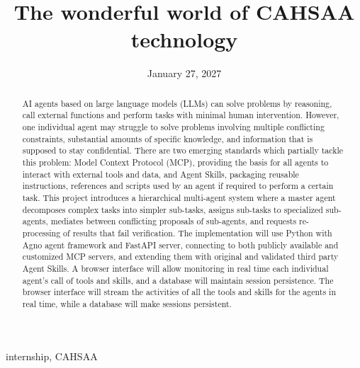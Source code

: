 \documentclass[12pt,conference,onecolumn]{IEEEtran}
\title{The wonderful world of CAHSAA technology}
\author{%
\IEEEauthorblockN{Jake Croft}\IEEEauthorblockA{Science \& Engineering\\Manalapan High School\\Englishtown, NJ\\\href{mailto:427mreznik@frhsd.com}{427mreznik@frhsd.com}}\and
\IEEEauthorblockN{Jacob Kadan}\IEEEauthorblockA{Science \& Engineering\\Manalapan High School\\Englishtown, NJ\\\href{mailto:427ssanrkitya@frhsd.com}{427ssankritya@frhsd.com}}
}
\date{January 27, 2027}
\newcommand{\keywords}{internship, CAHSAA}
\begin{document}
\maketitle 

\begin{abstract}
AI agents based on large language models (LLMs) can solve problems by reasoning, call external functions and perform tasks with minimal human intervention. However, one individual agent may struggle to solve problems involving multiple conflicting constraints, substantial amounts of specific knowledge, and information that is supposed to stay confidential. There are two emerging standards which partially tackle this problem: Model Context Protocol (MCP), providing the basis for all agents to interact with external tools and data, and Agent Skills, packaging reusable instructions, references and scripts used by an agent if required to perform a certain task. This project introduces a hierarchical multi-agent system where a master agent decomposes complex tasks into simpler sub-tasks, assigns sub-tasks to specialized sub-agents, mediates between conflicting proposals of sub-agents, and requests re-processing of results that fail verification. The implementation will use Python with Agno agent framework and FastAPI server, connecting to both publicly available and customized MCP servers, and extending them with original and validated third party Agent Skills. A browser interface will allow monitoring in real time each individual agent's call of tools and skills, and a database will maintain session persistence. The browser interface will stream the activities of all the tools and skills for the agents in real time, while a database will make sessions persistent.
\end{abstract}

\begin{IEEEkeywords}
\keywords
\end{IEEEkeywords}
\end{document}
